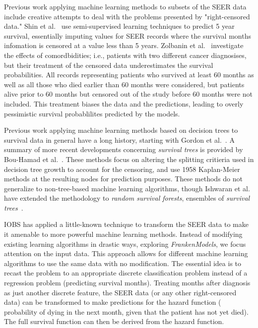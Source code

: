 \documentclass[a4paper,11pt]{article}
\begin{document}
Previous work applying machine learning methods to subsets of the SEER data include creative attempts to deal with the problems presented by  "right-censored data." Shin et al.~\cite{ISI:000337467400005} use semi-supervised learning techniques to predict 5 year survival, essentially imputing values for SEER records where the survival months infomation is censored at a value less than 5 years. Zolbanin et al.~\cite{ISI:000355882700012} investigate the effects of comordbidities; i.e., patients with two different cancer diagnosises, but their treatment of the censored data underestimates the survival probabilities. All records representing patients who survived at least 60 months as well as all those who died earlier than 60 months were considered, but patients alive prior to 60 months but censored out of the study before 60 months were not included. This treatment biases the data and the predictions, leading to overly pessimistic survival probablilites predicted by the models.


Previous work applying machine learning methods based on decision trees to survival data in general have a long history, starting with Gordon et al.~\cite{Gordon19851065}. A summary of more recent developments concerning \emph{survival trees} is provided by Bou-Hamad et al.~\cite{Bou-Hamad201144}. These methods focus on altering the splitting critieria used in decision tree growth to account for the censoring, and use 1958 Kaplan-Meier methods at the resulting nodes for prediction purposes. These methods do not generalize to non-tree-based machine learning algorithms, though Ishwaran et al. have extended the methodology to \emph{random survival forests}, ensembles of \emph{survival trees}~\cite{Ishwaran20101056}.


IOBS has applied a little-known technique to transform the SEER data to make it amenable to more powerful machine learning methods. Instead of modifying existing learning algorithms in drastic ways, exploring \emph{FrankenModels}, we focus attention on the input data. This approach allows for different machine learning algorithms to use the same data with no modification. The essential idea is to recast the problem to an appropriate discrete classification problem instead of a regression problem (predicting survival months). Treating months after diagnosis as just another discrete feature, the SEER data (or any other right-censored data) can be transformed to make predictions for the hazard function (
 probability of dying in the next month, given that the patient has not yet died).
The full survival function can then be derived from the hazard function.
\end{document}

